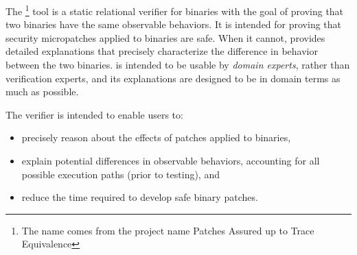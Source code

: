 The \TOOL{}\footnote{The name \TOOL{} comes from the project name Patches Assured up to Trace Equivalence} tool is a static relational verifier for binaries with the goal of proving that two binaries have the same observable behaviors. %
It is intended for proving that security micropatches applied to binaries are safe. %
When it cannot, \TOOL{} provides detailed explanations that precisely characterize the difference in behavior between the two binaries. %
\TOOL{} is intended to be usable by \emph{domain experts}, rather than verification experts, and its explanations are designed to be in domain terms as much as possible. %

The \TOOL{} verifier is intended to enable users to: %
\begin{itemize}
\item precisely reason about the effects of patches applied to binaries,
\item explain potential differences in observable behaviors, accounting for all possible execution paths (prior to testing), and
\item reduce the time required to develop safe binary patches.
\end{itemize}

